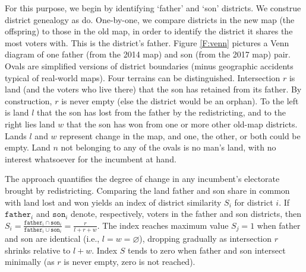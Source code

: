 \documentclass[letter,12pt]{article}
\begin{document}
For this purpose, we begin by identifying `father' and `son' districts. We construe district genealogy as \citet{cox.katz.2002} do. One-by-one, we compare districts in the new map (the offspring) to those in the old map, in order to identify the district it shares the most voters with. This is the district's father. Figure \ref{F:venn} pictures a Venn diagram of one father (from the 2014 map) and son (from the 2017 map) pair. Ovals are simplified versions of district boundaries (minus geographic accidents typical of real-world maps). Four terrains can be distinguished. Intersection $r$ is land (and the voters who live there) that the son has retained from its father. By construction, $r$ is never empty (else the district would be an orphan). To the left is land $l$ that the son has lost from the father by the redistricting, and to the right lies land $w$ that the son has won from one or more other old-map districts. Lands $l$ and $w$ represent change in the map, and one, the other, or both could be empty. Land $n$ not belonging to any of the ovals is no man's land, with no interest whatsoever for the incumbent at hand. 

The approach quantifies the degree of change in any incumbent's electorate brought by redistricting. Comparing the land father and son share in common with land lost and won yields an index of district similarity $S_i$ for district $i$. If {\small$\texttt{father}_i$} and {\small$\texttt{son}_i$} denote, respectively, voters in the father and son districts, then $S_i = \frac{\texttt{father}_i \cap \texttt{son}_i}{\texttt{father}_i \cup \texttt{son}_i} = \frac{r}{l+r+w}$. The index reaches maximum value $S_j=1$ when father and son are identical (i.e., $l=w=\varnothing$), dropping gradually as intersection $r$ shrinks relative to $l+w$. Index $S$ tends to zero when father and son intersect minimally (as $r$ is never empty, zero is not reached).
\end{document}
